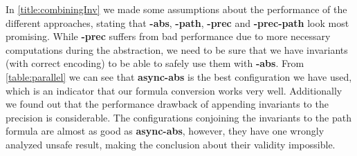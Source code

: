 In \autoref{title:combiningInv} we made some assumptions about the performance of the different approaches, stating that \textbf{-abs}, \textbf{-path}, \textbf{-prec} and \mbox{\textbf{-prec-path}} look most 
promising. While \textbf{-prec} suffers from bad performance due to more necessary computations during the abstraction, we need to be sure that we have invariants (with correct encoding) to be able
to safely use them with \textbf{-abs}. From \autoref{table:parallel} we can see that \textbf{async-abs} is the best configuration we have used, which is an indicator that our formula conversion works 
very well. Additionally we found out that the performance drawback of appending invariants to the precision is considerable. The configurations conjoining the invariants to the path formula are almost as 
good as \textbf{async-abs}, however, they have one wrongly analyzed unsafe result, making the conclusion about their validity impossible. 








